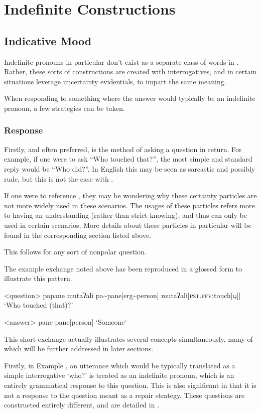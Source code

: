\section{Indefinite Constructions}
\subsection{Indicative Mood}
Indefinite pronouns in particular don't exist as a separate class of words in \langname .
Rather, these sorts of constructions are created with interrogatives, and in certain situations leverage uncertainty evidentials, to impart the same meaning.

When responding to something where the answer would typically be an indefinite pronoun, a few strategies can be taken.
\subsubsection{Response}
Firstly, and often preferred, is the method of asking a question in return.
For example, if one were to ask ``Who touched that?'', the most simple and standard reply would be ``Who did?''.
In English this may be seen as sarcastic and possibly rude, but this is not the case with \langname .

If one were to reference , they may be wondering why these certainty particles are not more widely used in these scenarios.
The usages of these particles refers more to having an understanding (rather than strict knowing), and thus can only be used in certain scenarios.
More details about these particles in particular will be found in the corresponding section listed above.

This follows for any sort of nonpolar question.

The example exchange noted above has been reproduced in a glossed form to illustrate this pattern.

\a<question>
\begingl
\glpreamble papane mutaʔali
\endpreamble
pa\textasciitilde pane[erg\textasciitilde person]
mutaʔali[\textsc{pst.pfv:}touch\textsc{[q]}]
\glft `Who touched (that)?'
\endgl

\a<answer>
\begingl
\glpreamble pane
\endpreamble
pane[person]
\glft `Someone'
\endgl
\xe

This short exchange actually illustrates several concepts simultaneously, many of which will be further addressed in later sections.

Firstly, in Example , an utterance which would be typically translated as a simple interrogative `who?' is treated as an indefinite pronoun, which is an entirely grammatical response to this question.
This is also significant in that it is not a response to the question meant as a repair strategy.
These questions are constructed entirely different, and are detailed in .

